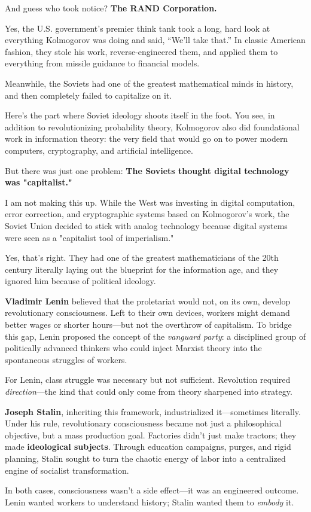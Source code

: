 And guess who took notice? \textbf{The RAND Corporation.}

Yes, the U.S. government’s premier think tank took a long, hard look at everything Kolmogorov was doing and said, “We’ll take that.” In classic American fashion, they stole his work, reverse-engineered them, and applied them to everything from missile guidance to financial models.

Meanwhile, the Soviets had one of the greatest mathematical minds in history, and then completely failed to capitalize on it.

Here’s the part where Soviet ideology shoots itself in the foot. You see, in addition to revolutionizing probability theory, Kolmogorov also did foundational work in information theory: the very field that would go on to power modern computers, cryptography, and artificial intelligence. 

But there was just one problem: \textbf{The Soviets thought digital technology was "capitalist."}  

I am not making this up. While the West was investing in digital computation, error correction, and cryptographic systems based on Kolmogorov’s work, the Soviet Union decided to stick with analog technology because digital systems were seen as a "capitalist tool of imperialism." 

Yes, that’s right. They had one of the greatest mathematicians of the 20th century literally laying out the blueprint for the information age, and they ignored him because of political ideology.  

\begin{tcolorbox}[colback=gray!5!white, colframe=black!80!white, title={Historical Sidenote: Lenin, Stalin, and the Machinery of Revolutionary Consciousness}]
  \textbf{Vladimir Lenin} believed that the proletariat would not, on its own, develop revolutionary consciousness. Left to their own devices, workers might demand better wages or shorter hours—but not the overthrow of capitalism. To bridge this gap, Lenin proposed the concept of the \emph{vanguard party}: a disciplined group of politically advanced thinkers who could inject Marxist theory into the spontaneous struggles of workers.  
  
  For Lenin, class struggle was necessary but not sufficient. Revolution required \emph{direction}—the kind that could only come from theory sharpened into strategy.  
  
  \medskip
  
  \textbf{Joseph Stalin}, inheriting this framework, industrialized it—sometimes literally. Under his rule, revolutionary consciousness became not just a philosophical objective, but a mass production goal. Factories didn’t just make tractors; they made \textbf{ideological subjects}. Through education campaigns, purges, and rigid planning, Stalin sought to turn the chaotic energy of labor into a centralized engine of socialist transformation.  
  
  \medskip
  
  In both cases, consciousness wasn’t a side effect—it was an engineered outcome. Lenin wanted workers to understand history; Stalin wanted them to \emph{embody} it.
\end{tcolorbox}


